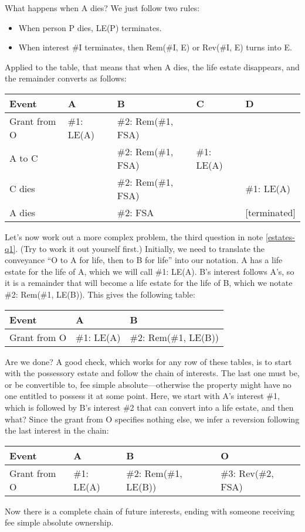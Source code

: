 What happens when A dies? We just follow two rules:
\begin{itemize}
\item When person P dies, LE(P) terminates.
\item When interest \#I terminates, then Rem(\#I, E) or Rev(\#I, E) turns into
E.
\end{itemize}
Applied to the table, that means that when A dies, the life estate disappears,
and the remainder converts as follows:
\begin{center}
\begin{tabular}{l|llll}
Event & A & B & C & D \\
\hline
Grant from O & \#1: LE(A) & \#2: Rem(\#1, FSA) & &\\
A to C & & \#2: Rem(\#1, FSA) & \#1: LE(A) & \\
C dies & & \#2: Rem(\#1, FSA) & & \#1: LE(A) \\
A dies & & \#2: FSA & & [terminated] \\
\end{tabular}
\end{center}

Let's now work out a more complex problem, the third question in note
\ref{estates-q1}. (Try to work it out yourself first.) Initially, we need to
translate the conveyance ``O to A for life, then to B for life'' into our
notation. A has a life estate for the life of A, which we will call \#1: LE(A).
B's interest follows A's, so it is a remainder that will become a life estate
for the life of B, which we notate \#2: Rem(\#1, LE(B)). This gives the
following table:
\begin{center}
\begin{tabular}{l|ll}
Event & A & B \\
\hline
Grant from O & \#1: LE(A) & \#2: Rem(\#1, LE(B)) \\
\end{tabular}
\end{center}
Are we done? A good check, which works for any row of these tables, is to start
with the possessory estate and follow the chain of interests. The last one must
be, or be convertible to, fee simple absolute---otherwise the property might
have no one entitled to possess it at some point. Here, we start with A's
interest \#1, which is followed by B's interest \#2 that can convert into a life
estate, and then what? Since the grant from O specifies nothing else, we infer a
reversion following the last interest in the chain:
\begin{center}
\begin{tabular}{l|lll}
Event & A & B & O \\
\hline
Grant from O & \#1: LE(A) & \#2: Rem(\#1, LE(B)) & \#3: Rev(\#2, FSA) \\
\end{tabular}
\end{center}
Now there is a complete chain of future interests, ending with someone receiving
fee simple absolute ownership.

